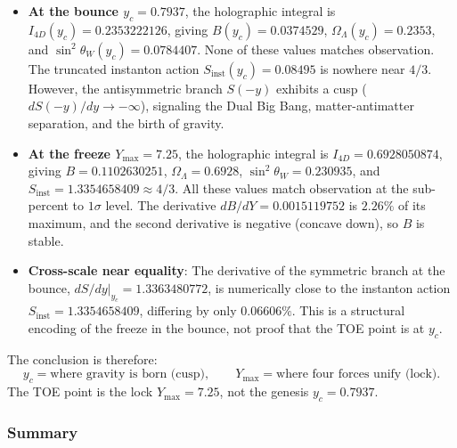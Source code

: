 \documentclass[12pt,oneside,openany]{book}
\begin{document}
\begin{itemize}
\item \textbf{At the bounce $y_c = 0.7937$}, the holographic integral is $I_{4D}(y_c) = 0.2353222126$, giving $B(y_c) = 0.0374529$, $\Omega_\Lambda(y_c) = 0.2353$, and $\sin^2\theta_W(y_c) = 0.0784407$. None of these values matches observation. The truncated instanton action $S_{\mathrm{inst}}(y_c) = 0.08495$ is nowhere near $4/3$. However, the antisymmetric branch $S(-y)$ exhibits a cusp ($dS(-y)/dy \to -\infty$), signaling the Dual Big Bang, matter-antimatter separation, and the birth of gravity.

\item \textbf{At the freeze $Y_{\max} = 7.25$}, the holographic integral is $I_{4D} = 0.6928050874$, giving $B = 0.1102630251$, $\Omega_\Lambda = 0.6928$, $\sin^2\theta_W = 0.230935$, and $S_{\mathrm{inst}} = 1.3354658409 \approx 4/3$. All these values match observation at the sub-percent to $1\sigma$ level. The derivative $dB/dY = 0.0015119752$ is $2.26\%$ of its maximum, and the second derivative is negative (concave down), so $B$ is stable.

\item \textbf{Cross-scale near equality}: The derivative of the symmetric branch at the bounce, $dS/dy|_{y_c} = 1.3363480772$, is numerically close to the instanton action $S_{\mathrm{inst}} = 1.3354658409$, differing by only $0.06606\%$. This is a structural encoding of the freeze in the bounce, not proof that the TOE point is at $y_c$.
\end{itemize}

The conclusion is therefore:
\begin{equation}
\boxed{y_c = \text{where gravity is born (cusp)}, \qquad Y_{\max} = \text{where four forces unify (lock)}.}
\label{eq:genesis-lock-table}
\end{equation}
The TOE point is the lock $Y_{\max} = 7.25$, not the genesis $y_c = 0.7937$.

\subsubsection{Summary}
\end{document}
